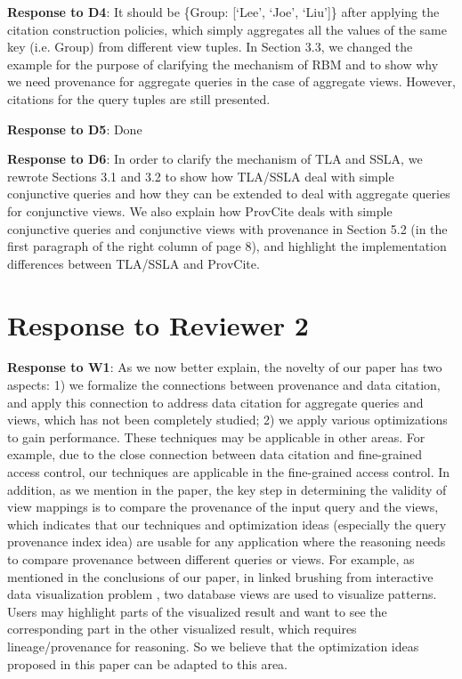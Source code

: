 \begin{appendix}
\textbf{Response to D4}:
It should be \{Group: [`Lee', `Joe', `Liu']\} after applying the citation construction policies, which simply aggregates all the values of the same key (i.e. Group) from different view tuples. In Section 3.3, we changed the example for the purpose of clarifying the mechanism of RBM and to show why we need provenance for aggregate queries in the case of aggregate views. However,  citations for the query tuples are still presented. 

\textbf{Response to D5}: Done


\textbf{Response to D6}: 
In order to clarify the mechanism of TLA and SSLA, we rewrote Sections 3.1 and 3.2 to show how TLA/SSLA deal with simple conjunctive queries and how they can be extended to deal with aggregate queries for conjunctive views. We also explain how ProvCite deals with simple conjunctive queries and conjunctive views with provenance in Section 5.2 (in the first paragraph of the right column of page 8), and highlight the implementation differences between TLA/SSLA and ProvCite.


\section{Response to Reviewer 2}

\textbf{Response to W1}:
As we now better explain, the novelty of our paper has two aspects: 1) we formalize the connections between provenance and data citation, and apply this connection to address data citation for aggregate queries and views, which has not been completely studied; 2) we apply various optimizations to gain performance.  These techniques may be applicable in other areas.  For example, due to the close connection between data citation and fine-grained access control, our techniques are applicable in the fine-grained access control. In addition, as we mention in the paper, the key step in determining the validity of view mappings is to compare the provenance of the input query and the views, which indicates that our techniques and optimization ideas (especially the query provenance index idea) are usable for any application where the reasoning needs to compare provenance between different queries or views. For example, as mentioned in the conclusions of our paper, in linked brushing from interactive data visualization problem \cite{psallidas2018smoke}, two database views are used to visualize patterns. Users may highlight parts of the visualized result and want to see the corresponding part in the other visualized result, which requires lineage/provenance for reasoning. So we believe that the optimization ideas proposed in this paper can be adapted to this area.


\end{appendix}
